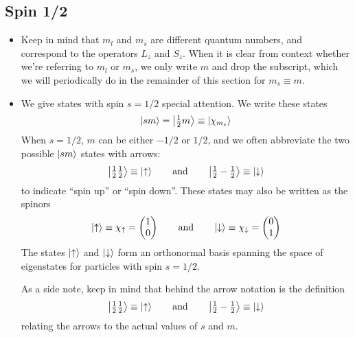 \documentclass[11pt, a4paper]{article}
\newcommand{\eqtext}[1]{\qquad \text{#1} \qquad}
\newcommand{\ua}{\uparrow}  %
\newcommand{\da}{\downarrow}  %
\begin{document}
\subsection{Spin 1/2}
\begin{itemize}
	\item Keep in mind that $ m_{l} $ and $ m_{s} $ are different quantum numbers, and correspond to the operators $ L_{z} $ and $ S_{z} $. When it is clear from context whether we're referring to $ m_{l} $ or $ m_{s} $, we only write $ m $ and drop the subscript, which we will periodically do in the remainder of this section for $ m_{s} \equiv m $. 
	
	\item We give states with spin $ s = 1/2 $ special attention. We write these states
	\begin{equation*}
		\ket{sm} = \ket{\tfrac{1}{2} m} \equiv \ket{\chi_{m_{s}}}
	\end{equation*}
	When $ s = 1/2 $, $ m $ can be either $ -1/2 $ or $ 1/2 $, and we often abbreviate the two possible $ \ket{sm} $  states with arrows:
	\begin{equation*}
		\ket{\tfrac{1}{2}\tfrac{1}{2}} \equiv \ket{\ua} \eqtext{and} \ket{\tfrac{1}{2}-\tfrac{1}{2}} \equiv \ket{\da}
	\end{equation*}
	to indicate ``spin up'' or ``spin down''. These states may also be written as the spinors
	\begin{equation*}
		\ket{\ua}  \equiv \chi_{\ua} = 
		\begin{pmatrix}
			1\\
			0
		\end{pmatrix}
		\eqtext{and}
		\ket{\da}  \equiv \chi_{\da} = 
		\begin{pmatrix}
			0\\
			1
		\end{pmatrix}
	\end{equation*}
	The states $ \ket{\ua} $ and $ \ket{\da} $ form an orthonormal basis spanning the space of eigenstates for particles with spin $ s = 1/2 $.
	
	As a side note, keep in mind that behind the arrow notation is the definition
	\begin{equation*}
		\ket{\tfrac{1}{2}\tfrac{1}{2}} \equiv \ket{\ua} \eqtext{and} \ket{\tfrac{1}{2}-\tfrac{1}{2}} \equiv \ket{\da}
	\end{equation*}
	relating the arrows to the actual values of $ s $ and $ m $.
	

\end{itemize}
\end{document}
